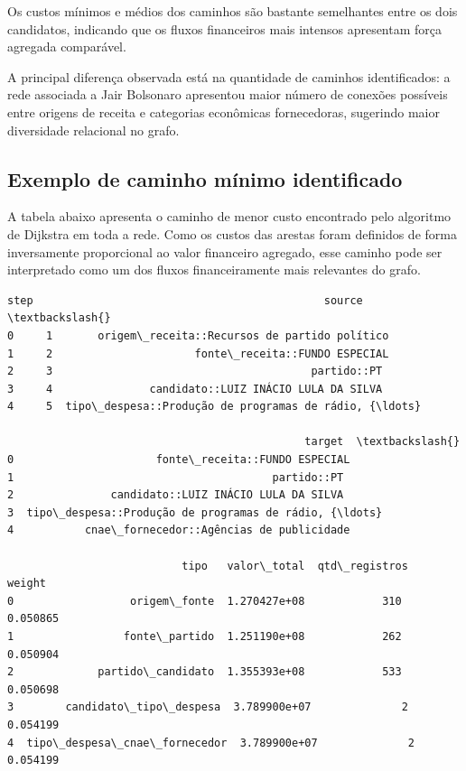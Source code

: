 \documentclass[11pt]{article}
\begin{document}
Os custos mínimos e médios dos caminhos são bastante semelhantes entre
os dois candidatos, indicando que os fluxos financeiros mais intensos
apresentam força agregada comparável.

A principal diferença observada está na quantidade de caminhos
identificados: a rede associada a Jair Bolsonaro apresentou maior número
de conexões possíveis entre origens de receita e categorias econômicas
fornecedoras, sugerindo maior diversidade relacional no grafo.

    \subsection{Exemplo de caminho mínimo
identificado}\label{exemplo-de-caminho-muxednimo-identificado}

A tabela abaixo apresenta o caminho de menor custo encontrado pelo
algoritmo de Dijkstra em toda a rede. Como os custos das arestas foram
definidos de forma inversamente proporcional ao valor financeiro
agregado, esse caminho pode ser interpretado como um dos fluxos
financeiramente mais relevantes do grafo.

            \begin{tcolorbox}[breakable, size=fbox, boxrule=.5pt, pad at break*=1mm, opacityfill=0]
\begin{Verbatim}[commandchars=\\\{\}]
   step                                             source  \textbackslash{}
0     1       origem\_receita::Recursos de partido político
1     2                      fonte\_receita::FUNDO ESPECIAL
2     3                                        partido::PT
3     4               candidato::LUIZ INÁCIO LULA DA SILVA
4     5  tipo\_despesa::Produção de programas de rádio, {\ldots}

                                              target  \textbackslash{}
0                      fonte\_receita::FUNDO ESPECIAL
1                                        partido::PT
2               candidato::LUIZ INÁCIO LULA DA SILVA
3  tipo\_despesa::Produção de programas de rádio, {\ldots}
4           cnae\_fornecedor::Agências de publicidade

                           tipo   valor\_total  qtd\_registros    weight
0                  origem\_fonte  1.270427e+08            310  0.050865
1                 fonte\_partido  1.251190e+08            262  0.050904
2             partido\_candidato  1.355393e+08            533  0.050698
3        candidato\_tipo\_despesa  3.789900e+07              2  0.054199
4  tipo\_despesa\_cnae\_fornecedor  3.789900e+07              2  0.054199
\end{Verbatim}
\end{tcolorbox}
        
\end{document}
